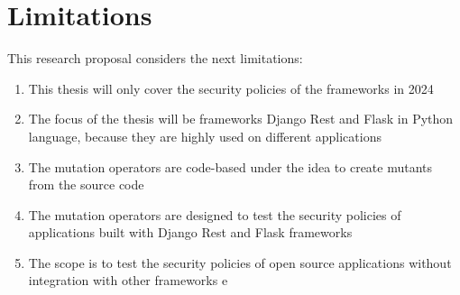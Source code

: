 
\section{Limitations}

This research proposal considers the next limitations:

\begin{enumerate}
    \item This thesis will only cover the security policies of the frameworks in 2024
    \item The focus of the thesis will be frameworks Django Rest and Flask in Python language, because they are highly used on different applications
    \item The mutation operators are code-based under the idea to create mutants from the source code
    \item The mutation operators are designed to test the security policies of applications built with Django Rest and Flask frameworks
    \item The scope is to test the security policies of open source applications without integration with other frameworks e
\end{enumerate}
